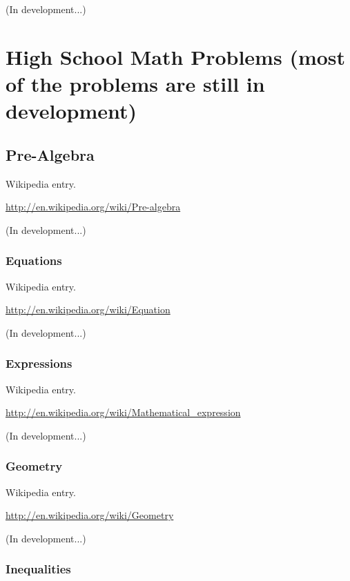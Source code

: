 \documentclass[12pt,twoside]{book}
\begin{document}
(In development...)


\bigskip


\bigskip

\chapter[High School Math Problems]{High School Math Problems (most of the problems are still in development)}

\section[Pre{}-Algebra]{Pre{}-Algebra}

Wikipedia entry.

\href{http://en.wikipedia.org/wiki/Pre-algebra}{http://en.wikipedia.org/wiki/Pre{}-algebra}

(In development...)

\subsection[Equations]{Equations}

Wikipedia entry.

\href{http://en.wikipedia.org/wiki/Equation}{http://en.wikipedia.org/wiki/Equation}

(In development...)

\subsection[Expressions]{Expressions}

Wikipedia entry.

\href{http://en.wikipedia.org/wiki/Mathematical_expression}{http://en.wikipedia.org/wiki/Mathematical\_expression}

(In development...)

\subsection[Geometry]{Geometry}

Wikipedia entry.

\href{http://en.wikipedia.org/wiki/Geometry}{http://en.wikipedia.org/wiki/Geometry}

(In development...)

\subsection[Inequalities]{Inequalities}
\end{document}
